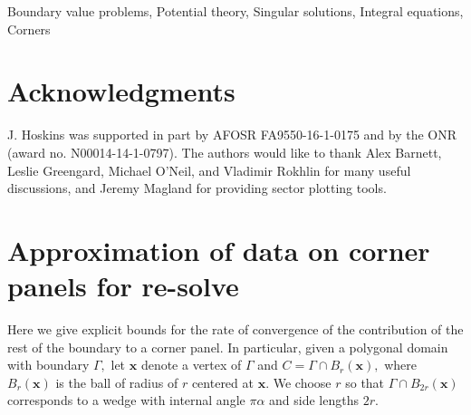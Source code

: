 \documentclass[12pt,times]{elsarticle}
\newcommand{\bx}{\boldsymbol{x}}
\begin{document}
\begin{frontmatter}
\begin{keyword}
Boundary value problems, Potential theory, Singular solutions, Integral equations, Corners
\end{keyword}

\end{frontmatter}









\section{Acknowledgments}
J. Hoskins was supported in part by AFOSR FA9550-16-1-0175 and by the ONR (award no. N00014-14-1-0797).
The authors would like to thank Alex Barnett, Leslie Greengard, Michael O'Neil, and Vladimir Rokhlin for many useful discussions, and Jeremy Magland for providing sector plotting tools.

\appendix
\section{Approximation of data on corner panels for re-solve}
Here we give explicit bounds for the rate of convergence of the contribution of the rest of the boundary to a corner panel.{\color{red}  In particular, given a polygonal domain with boundary $\Gamma,$ let $\bx$ denote a vertex of $\Gamma$ and $C = \Gamma \cap B_r(\bx),$ where $B_r(\bx)$ is the ball of radius of $r$ centered at $\bx.$ We choose $r$ so that $\Gamma \cap B_{2r}(\bx)$ corresponds to a wedge with internal angle $\pi \alpha$ and side lengths $2r.$ }
\end{document}
